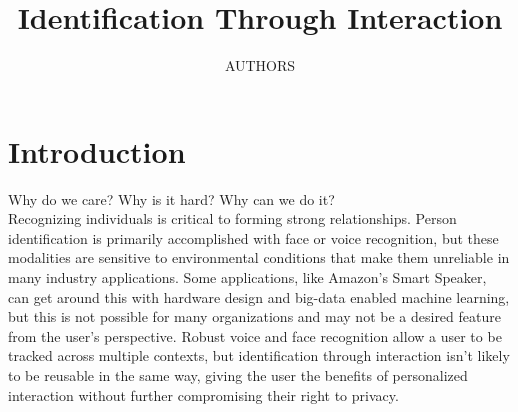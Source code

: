 \documentclass[conference]{IEEEtran}
\title{Identification Through Interaction}
\author{AUTHORS \meta{TODO: LIST AUTHORS}} %
\date{\vspace{-1em}}
\newcommand{\elaine}[1]{{\textcolor[rgb]{0.1,0.4,0.6}{[ESS: {\it #1}]}}}
\begin{document}
\maketitle


\section{Introduction}
Why do we care? Why is it hard? Why can we do it?\\

Recognizing individuals is critical to forming strong relationships. Person identification is primarily accomplished with face or voice recognition, but these modalities are sensitive to environmental conditions that make them unreliable in many industry applications. Some applications, like Amazon's Smart Speaker, can get around this with hardware design and big-data enabled machine learning, but this is not possible for many organizations and may not be a desired feature from the user's perspective. Robust voice and face recognition allow a user to be tracked across multiple contexts, but identification through interaction isn't likely to be reusable in the same way, giving the user the benefits of personalized interaction without further compromising their right to privacy.

\end{document}

